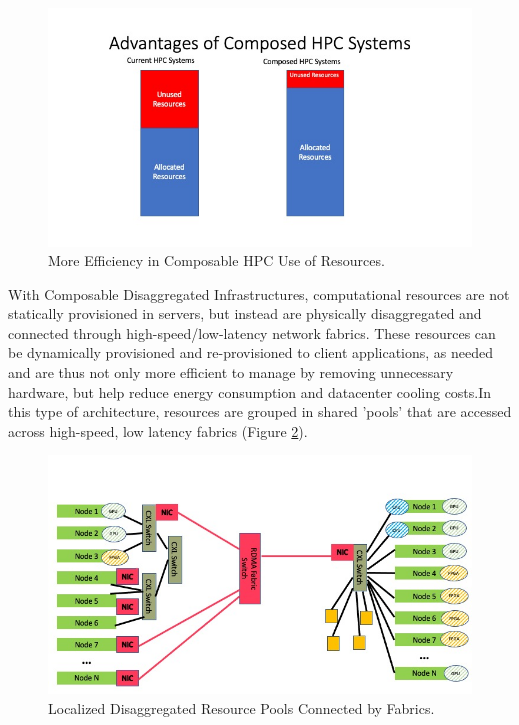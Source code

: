 \begin{figure}
\centerline{\includegraphics[width=\columnwidth]{Slide3.jpeg}}
\caption{More Efficiency in Composable HPC Use of Resources.} 
\label{fig:stranded}
\end{figure}

With Composable Disaggregated Infrastructures, computational resources are not statically provisioned in servers, but instead are physically disaggregated and connected through high-speed/low-latency network fabrics.  These resources can be dynamically provisioned and re-provisioned to client applications, as needed and are thus not only more efficient to manage by removing unnecessary hardware, but help reduce energy consumption and datacenter cooling costs.In this type of architecture, resources are grouped in shared 'pools' that are accessed across high-speed, low latency fabrics (Figure \ref{fig:Pools}). 


\begin{figure}
\centerline{\includegraphics[width=\columnwidth]{pools2.jpeg}}
\caption{Localized Disaggregated Resource Pools Connected by Fabrics.} 
\label{fig:Pools}
\end{figure}
  
